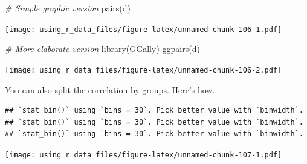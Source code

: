 \documentclass[
]{book}
\newenvironment{Shaded}{\begin{snugshade}}{\end{snugshade}}
\newcommand{\AttributeTok}[1]{\textcolor[rgb]{0.77,0.63,0.00}{#1}}
\newcommand{\CommentTok}[1]{\textcolor[rgb]{0.56,0.35,0.01}{\textit{#1}}}
\newcommand{\ConstantTok}[1]{\textcolor[rgb]{0.00,0.00,0.00}{#1}}
\newcommand{\DecValTok}[1]{\textcolor[rgb]{0.00,0.00,0.81}{#1}}
\newcommand{\FunctionTok}[1]{\textcolor[rgb]{0.00,0.00,0.00}{#1}}
\newcommand{\NormalTok}[1]{#1}
\newcommand{\OtherTok}[1]{\textcolor[rgb]{0.56,0.35,0.01}{#1}}
\newcommand{\SpecialCharTok}[1]{\textcolor[rgb]{0.00,0.00,0.00}{#1}}
\newcommand{\StringTok}[1]{\textcolor[rgb]{0.31,0.60,0.02}{#1}}
\begin{document}
\begin{Shaded}
\begin{Highlighting}[]
\CommentTok{\# Simple graphic version}
\FunctionTok{pairs}\NormalTok{(d)}
\end{Highlighting}
\end{Shaded}

\texttt{[image: using\_r\_data\_files/figure-latex/unnamed-chunk-106-1.pdf]}

\begin{Shaded}
\begin{Highlighting}[]
\CommentTok{\# More elaborate version}
\FunctionTok{library}\NormalTok{(GGally)}
\FunctionTok{ggpairs}\NormalTok{(d)}
\end{Highlighting}
\end{Shaded}

\texttt{[image: using\_r\_data\_files/figure-latex/unnamed-chunk-106-2.pdf]}

You can also split the correlation by groups. Here's how.

\begin{Shaded}
\end{Shaded}

\begin{verbatim}
## `stat_bin()` using `bins = 30`. Pick better value with `binwidth`.
## `stat_bin()` using `bins = 30`. Pick better value with `binwidth`.
## `stat_bin()` using `bins = 30`. Pick better value with `binwidth`.
\end{verbatim}

\texttt{[image: using\_r\_data\_files/figure-latex/unnamed-chunk-107-1.pdf]}
\end{document}
